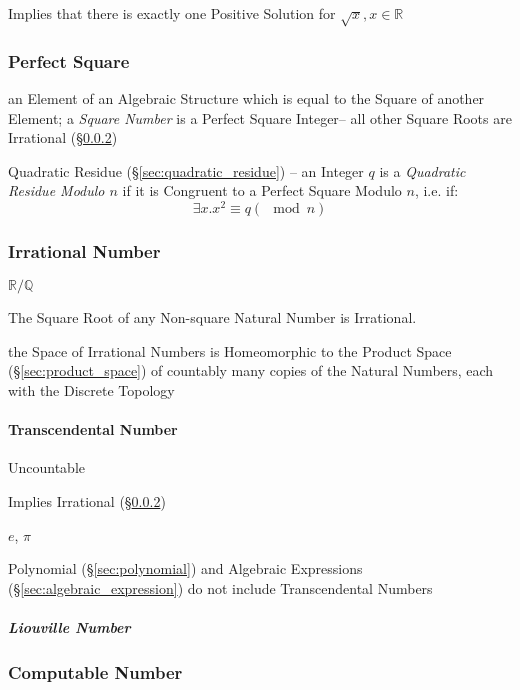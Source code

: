 Implies that there is exactly one Positive Solution for
$\sqrt{x}, x \in \mathbb{R}$



\subsubsection{Perfect Square}\label{sec:perfect_square}

an Element of an Algebraic Structure which is equal to the Square of another
Element; a \emph{Square Number} is a Perfect Square Integer--
all other Square Roots are Irrational (\S\ref{sec:irrational})

\fist Quadratic Residue (\S\ref{sec:quadratic_residue}) -- an Integer $q$ is a
\emph{Quadratic Residue Modulo $n$} if it is Congruent to a Perfect Square
Modulo $n$, i.e. if:
\[
  \exists x . x^2 \equiv q (\mod n)
\]



\subsubsection{Irrational Number}\label{sec:irrational}

$\mathbb{R}/\mathbb{Q}$

The Square Root of any Non-square Natural Number is Irrational.

the Space of Irrational Numbers is Homeomorphic to the Product Space
(\S\ref{sec:product_space}) of countably many copies of the Natural Numbers,
each with the Discrete Topology



\paragraph{Transcendental Number}\label{sec:transcendental}\hfill

Uncountable

Implies Irrational (\S\ref{sec:irrational})

$e$, $\pi$

Polynomial (\S\ref{sec:polynomial}) and Algebraic Expressions
(\S\ref{sec:algebraic_expression}) do not include Transcendental Numbers



\subparagraph{Liouville Number}\label{sec:liouville_number}\hfill



\subsubsection{Computable Number}\label{sec:computable_real}

